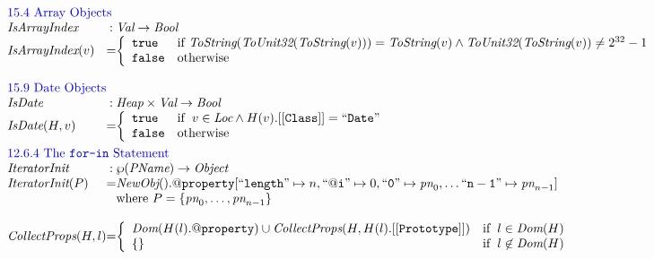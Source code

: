 \[
\begin{array}{l@{}c@{}l}
\multicolumn{3}{l}{\mbox{\inblue 15.4 Array Objects}}\\
\hf{IsArrayIndex} & :& \Val \rightarrow \Bool \\
\hf{IsArrayIndex}(v) &=&
\left\{ \begin{array}{ll}
\true &\mbox{if $\hf{ToString}(\hf{ToUnit32}(\hf{ToString}(v))) = \hf{ToString}(v) \wedge
\hf{ToUnit32}(\hf{ToString}(v)) \not= 2^{32}-1$}\\
\false&\mbox{otherwise}\\
\end{array}
\right.
\\\\

\multicolumn{3}{l}{\mbox{\inblue 15.9 Date Objects}}\\
\hf{IsDate} & :& \Heap \times \Val \rightarrow \Bool \\
\hf{IsDate}(H,v) &=&
\left\{ \begin{array}{ll}
\true &\ifc{v \in \Loc\wedge
H(v).{\tt[[Class]]} = {\tt ``Date"}%
}\\
\false&\mbox{otherwise}\\
\end{array}
\right.
\\[1em]



\multicolumn{3}{l}{\mbox{\inblue 12.6.4 The {\tt for-in} Statement}}\\
\hf{IteratorInit} & :& \wp(\pname) \rightarrow \Obj \\
\hf{IteratorInit}(P) &=&
\hf{NewObj}().{\tt@property}[
{\tt``length"} \mapsto n,%
{\tt``@i"} \mapsto0,%
{\tt``0"} \mapsto\emph{pn}_0,%
\ldots
{\tt``n-1"} \mapsto\emph{pn}_{n-1}]%
\\
&&
\mbox{where}\
P = \{\emph{pn}_0, \ldots, \emph{pn}_{n-1}\}
\\\\

%
 \hf{CollectProps}(H, l) &=&
 \left\{ \begin{array}{ll}
 \hf{Dom}(H(l).{\tt @property}) \cup \hf{CollectProps}(H, H(l).{\tt [[Prototype]]})
&\ifc{l \in\hf{Dom}(H)}\\
\{\} &\ifc{l \not\in \hf{Dom}(H)}
 \end{array}
 \right.
 \\\\



\end{array}\]
